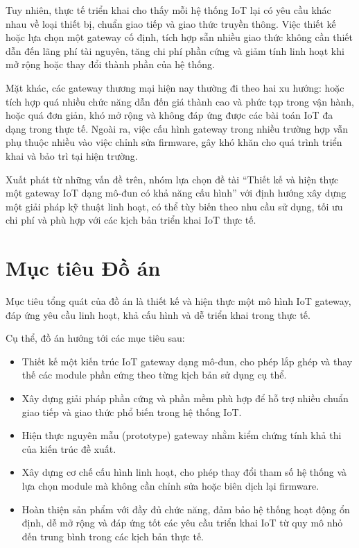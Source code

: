         Tuy nhiên, thực tế triển khai cho thấy mỗi hệ thống IoT lại có yêu cầu khác nhau về loại thiết bị, chuẩn giao tiếp và giao thức truyền thông. Việc thiết kế hoặc lựa chọn một gateway cố định, tích hợp sẵn nhiều giao thức không cần thiết dẫn đến lãng phí tài nguyên, tăng chi phí phần cứng và giảm tính linh hoạt khi mở rộng hoặc thay đổi thành phần của hệ thống.

        Mặt khác, các gateway thương mại hiện nay thường đi theo hai xu hướng: hoặc tích hợp quá nhiều chức năng dẫn đến giá thành cao và phức tạp trong vận hành, hoặc quá đơn giản, khó mở rộng và không đáp ứng được các bài toán IoT đa dạng trong thực tế. Ngoài ra, việc cấu hình gateway trong nhiều trường hợp vẫn phụ thuộc nhiều vào việc chỉnh sửa firmware, gây khó khăn cho quá trình triển khai và bảo trì tại hiện trường.

        Xuất phát từ những vấn đề trên, nhóm lựa chọn đề tài “Thiết kế và hiện thực một gateway IoT dạng mô-đun có khả năng cấu hình” với định hướng xây dựng một giải pháp kỹ thuật linh hoạt, có thể tùy biến theo nhu cầu sử dụng, tối ưu chi phí và phù hợp với các kịch bản triển khai IoT thực tế.
    \section{Mục tiêu Đồ án}
        Mục tiêu tổng quát của đồ án là thiết kế và hiện thực một mô hình IoT gateway, đáp ứng yêu cầu linh hoạt, khả cấu hình và dễ triển khai trong thực tế.

        Cụ thể, đồ án hướng tới các mục tiêu sau:
        \begin{itemize}
            \item Thiết kế một kiến trúc IoT gateway dạng mô-đun, cho phép lắp ghép và thay thế các module phần cứng theo từng kịch bản sử dụng cụ thể.
            \item Xây dựng giải pháp phần cứng và phần mềm phù hợp để hỗ trợ nhiều chuẩn giao tiếp và giao thức phổ biến trong hệ thống IoT.
            \item Hiện thực nguyên mẫu (prototype) gateway nhằm kiểm chứng tính khả thi của kiến trúc đề xuất.
            \item Xây dựng cơ chế cấu hình linh hoạt, cho phép thay đổi tham số hệ thống và lựa chọn module mà không cần chỉnh sửa hoặc biên dịch lại firmware.
            \item Hoàn thiện sản phẩm với đầy đủ chức năng, đảm bảo hệ thống hoạt động ổn định, dễ mở rộng và đáp ứng tốt các yêu cầu triển khai IoT từ quy mô nhỏ đến trung bình trong các kịch bản thực tế.
        \end{itemize}

